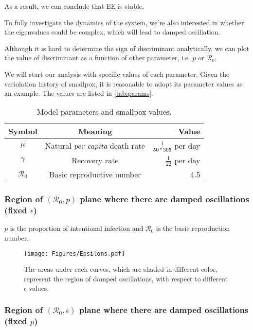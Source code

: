 \documentclass[12pt]{article}
\newcommand{\R}{\mathcal{R}}
\begin{document}
As a result, we can conclude that EE is stable.

To fully investigate the dynamics of the system, we're also interested in whether the eigenvalues could be complex, which will lead to damped oscillation. 

Although it is hard to determine the sign of discriminant analytically, we can plot the value of discriminant as a function of other parameter, i.e. $p$ or $\R_0$.

We will start our analysis with specific values of each parameter. Given the variolation history of smallpox, it is reasonable to adopt its parameter values as an example. The values are listed in \autoref{tab:params}.

\begin{table}[H]
\begin{center}
\caption{Model parameters and smallpox values.}
\label{tab:params}
\smallskip
\begin{tabular}{c|c|r}
{\bfseries Symbol} & {\bfseries Meaning} & {\bfseries Value} \\\hline
$\mu$ & Natural \emph{per capita} death rate & $\frac{1}{50*365}$ per day \\
$\gamma$ & Recovery rate & $\frac{1}{22}$ per day \\
$\R_0$ & Basic reproductive number & 4.5
\end{tabular}
\end{center}
\end{table}

\subsubsection{Region of $(\R_0,p)$ plane where there are damped
  oscillations (fixed $\epsilon$)}

$p$ is the proportion of intentional infection and $\R_0$ is the basic reproduction number.

\begin{figure}[H]
  \centering
  \texttt{[image: Figures/Epsilons.pdf]}
  \caption{The areas under each curves, which are shaded in different color, represent the region of damped oscillations, with respect to different $\epsilon$ values.}
\end{figure}

\subsubsection{Region of $(\R_0,\epsilon)$ plane where there are damped
  oscillations (fixed $p$)}
\end{document}
